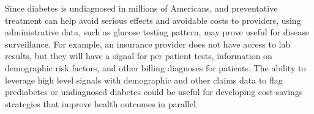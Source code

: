 Since diabetes is undiagnosed in millions of Americans, and preventative treatment can help avoid serious effects and avoidable costs to providers, using administrative data, such as glucose testing pattern, may prove useful for disease surveillance.  For example, an insurance provider does not have access to lab results, but they will have a signal for per patient tests, information on demographic risk factors, and other billing diagnoses for patients. The ability to leverage high level signals with demographic and other claims data to flag prediabetes or undiagnosed diabetes could be useful for developing cost-savings strategies that improve health outcomes in parallel.
